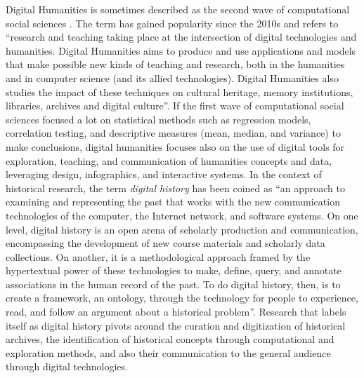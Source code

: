 Digital Humanities is sometimes described as the second wave of computational social sciences \cite{lemercierQuantitativeMethodsHumanities2019}.
The term has gained popularity since the 2010s and refers to ``research and teaching taking place at the intersection of digital technologies and humanities. Digital Humanities aims to produce and use applications and models that make possible new kinds of teaching and research, both in the humanities and
in computer science (and its allied technologies). Digital Humanities also studies the impact of these techniques on cultural heritage, memory institutions, libraries, archives and digital culture''\cite{terras2011quantifying}.
If the first wave of computational social sciences focused a lot on statistical methods such as regression models, correlation testing, and descriptive measures (mean, median, and variance) to make conclusions, digital humanities focuses also on the use of digital tools for exploration, teaching, and communication of humanities concepts and data, leveraging design, infographics, and interactive systems\cite{burdickDigitalHumanities2016}.
In the context of historical research, the term \textit{digital history} has been coined as ``an approach to examining and representing the past that works with the new communication technologies of the computer, the Internet network, and software systems. On one level, digital history is an open arena of scholarly production and communication, encompassing the development of new course materials and scholarly data collections. On another, it is a methodological approach framed by the hypertextual power of these technologies to make, define, query, and annotate associations in the human record of the past. To do digital history, then, is to create a framework, an ontology, through the technology for people to experience, read, and follow an argument about a historical problem''\cite{InterchangePromiseDigital2008}.
Research that labels itself as digital history pivots around the curation and digitization of historical archives, the identification of historical concepts through computational and exploration methods, and also their communication to the general audience through digital technologies.
